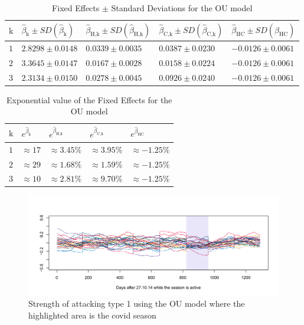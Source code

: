 \begin{table}[!ht]
\centering
\begin{tabular}{ |p{.3cm}|p{3cm}|p{3cm}|p{3cm}|p{3cm}|  }
    \hline
    $\text{k}$ & $\hat\beta_\text{k} \pm SD(\hat\beta_\text{k})$& $\hat\beta_{\text{H},\text{k}} \pm SD(\hat\beta_{\text{H},\text{k}})$ & $\hat\beta_{\text{C},\text{k}} \pm SD(\hat\beta_{\text{C},\text{k}})$ & $\hat\beta_\text{HC} \pm SD(\hat\beta_\text{HC})$ \\
    \hline
    $1$ & $2.8298 \pm 0.0148$ & $0.0339 \pm 0.0035$ & $0.0387 \pm 0.0230$ & $-0.0126 \pm 0.0061$ \\
    $2$ & $3.3645 \pm 0.0147$ & $0.0167 \pm 0.0028$ & $0.0158 \pm 0.0224$ & $-0.0126 \pm 0.0061$ \\
    $3$ & $2.3134 \pm 0.0150$ & $0.0278 \pm 0.0045$ & $0.0926 \pm 0.0240$ & $-0.0126 \pm 0.0061$ \\
    \hline
\end{tabular}
\caption{Fixed Effects $\pm$ Standard Deviations for the OU model}
\label{table:fixedEffCovidOU}
\end{table}

\begin{table}[!ht]
\centering
\begin{tabular}{ |p{.5cm}|p{2cm}|p{2cm}|p{2cm}|p{2cm}|  }
    \hline
    $\text{k}$ & $e^{\hat\beta_\text{k}}$ & $e^{\hat\beta_{\text{H},\text{k}}}$ & $e^{\hat\beta_{\text{C},\text{k}}}$ & $e^{\hat\beta_\text{HC}}$ \\
    \hline
    $1$ & $\approx 17$ & $\approx 3.45\%$ & $\approx 3.95\%$ & $\approx -1.25\%$ \\
    $2$ & $\approx 29$ & $\approx 1.68\%$ & $\approx 1.59\%$ & $\approx -1.25\%$ \\
    $3$ & $\approx 10$ & $\approx 2.81\%$ & $\approx 9.70\%$ & $\approx -1.25\%$ \\
    \hline
\end{tabular}
\caption{Exponential value of the Fixed Effects for the OU model}
\label{table:fixedEffExpCovidOU}
\end{table}

\begin{figure}[H]
    \centering
    \includegraphics[width=1\textwidth]{Figures/OU1.png}
    \caption[OU1]{Strength of attacking type 1 using the OU model where the highlighted area is the covid season}
    \label{fig:OU1}
\end{figure}

